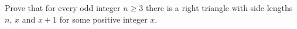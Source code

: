 Prove that for every odd integer $n\ge3$ there is a right triangle with side lengths $n$, $x$ and $x+1$ for some positive integer $x$.
